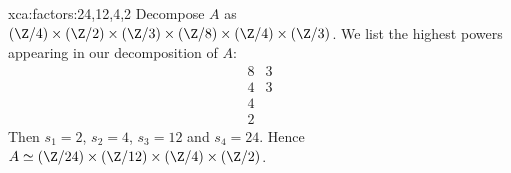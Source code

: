 
\begin{sol}{xca:factors:24,12,4,2}
Decompose $A$ as $(\Z/4)\times(\Z/2)\times(\Z/3)\times(\Z/8)\times(\Z/4)\times(\Z/3)$.
We list the highest powers appearing in our decomposition of $A$: 
\[ 
\begin{matrix}
8&3\\
4&3\\
4\\
2
\end{matrix} 
\] 
Then $s_1=2$, $s_2=4$, $s_3=12$ and $s_4=24$. Hence 
$A\simeq (\Z/24)\times(\Z/12)\times(\Z/4)\times(\Z/2)$.
\end{sol}
